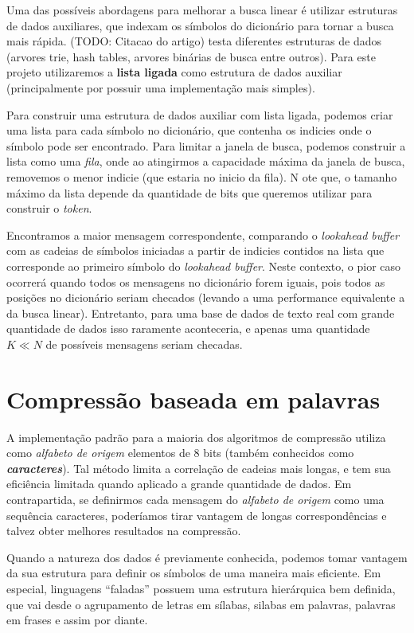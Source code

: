 Uma das possíveis abordagens para melhorar a busca linear é utilizar estruturas de dados auxiliares, que indexam os símbolos do dicionário para tornar a busca mais rápida.
(TODO: Citacao do artigo) testa diferentes estruturas de dados (arvores trie, hash tables, arvores binárias de busca entre outros). 
Para este projeto utilizaremos a \textbf{lista ligada} como estrutura de dados auxiliar (principalmente por possuir uma implementação mais simples). 

Para construir uma estrutura de dados auxiliar com lista ligada, podemos criar uma lista para cada símbolo no dicionário, que contenha os indicies onde o símbolo pode ser encontrado.  
Para limitar a janela de busca, podemos construir a lista como uma \emph{fila}, onde ao atingirmos a capacidade máxima da janela de busca, removemos o menor indicie (que estaria no inicio da fila). N
ote que, o tamanho máximo da lista depende da quantidade de bits que queremos utilizar para construir o \emph{token}.

Encontramos a maior mensagem correspondente, comparando o \emph{lookahead buffer} com as cadeias de símbolos iniciadas a partir de indicies contidos na lista que corresponde ao primeiro símbolo do \emph{lookahead buffer}.
Neste contexto, o pior caso ocorrerá quando todos os mensagens no dicionário forem iguais, pois todos as posições no dicionário seriam checados (levando a uma performance equivalente a da busca linear).
Entretanto, para uma base de dados de texto real com grande quantidade de dados isso raramente aconteceria, e apenas uma quantidade $K \ll N$ de possíveis mensagens seriam checadas.

\section{Compressão baseada em palavras}
A implementação padrão para a maioria dos algoritmos de compressão utiliza como \emph{alfabeto de origem} elementos de 8 bits (também conhecidos como \textbf{\emph{caracteres}}).
Tal método limita a correlação de cadeias mais longas, e tem sua eficiência limitada quando aplicado a grande quantidade de dados. 
Em contrapartida, se definirmos cada mensagem do \emph{alfabeto de origem} como uma sequência caracteres, poderíamos tirar vantagem de longas correspondências e talvez obter melhores resultados na compressão.

Quando a natureza dos dados é previamente conhecida, podemos tomar vantagem da sua estrutura para definir os símbolos de uma maneira mais eficiente. 
Em especial, linguagens ``faladas'' possuem uma estrutura hierárquica bem definida, que vai desde o agrupamento de letras em sílabas, silabas em palavras, palavras em frases e assim por diante. 

